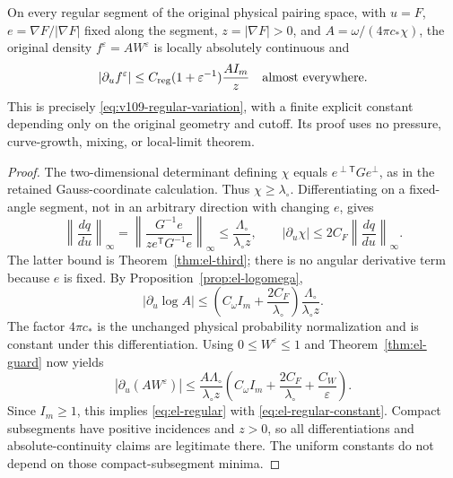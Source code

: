\begin{theorem}
\label{thm:el-regular}
On every regular segment of the original physical pairing space,
with $u=F$, $e=\nabla F/|\nabla F|$ fixed along the segment,
$z=|\nabla F|>0$, and
$A=\omega/(4\pi c_*\chi)$, the original density
$f^\varepsilon=AW^\varepsilon$ is locally absolutely continuous and
\begin{equation}\label{eq:el-regular}
 |\partial_u f^\varepsilon|
 \leq C_{\rm reg}(1+\varepsilon^{-1})\frac{AI_m}{z}
 \quad\hbox{almost everywhere.}
\end{equation}
This is precisely \eqref{eq:v109-regular-variation}, with a finite
explicit constant depending only on the original geometry and cutoff.
Its proof uses no pressure, curve-growth, mixing, or local-limit theorem.
\end{theorem}
\begin{proof}
The two-dimensional determinant defining $\chi$ equals
$e^{\perp\mathsf T}Ge^\perp$, as in the retained Gauss-coordinate
calculation. Thus $\chi\geq\lambda_\circ$. Differentiating on a fixed-angle
segment, not in an arbitrary direction with changing $e$, gives
\[
 \left\|\frac{dq}{du}\right\|_\infty
 =\left\|\frac{G^{-1}e}{z e^{\mathsf T}G^{-1}e}\right\|_\infty
 \leq\frac{\Lambda_\circ}{\lambda_\circ z},\qquad
 |\partial_u\chi|\leq2C_F\left\|\frac{dq}{du}\right\|_\infty.
\]
The latter bound is Theorem~\ref{thm:el-third}; there is no angular
derivative term because $e$ is fixed. By Proposition~\ref{prop:el-logomega},
\[
 |\partial_u\log A|
 \leq\left(C_\omega I_m+\frac{2C_F}{\lambda_\circ}\right)
                              \frac{\Lambda_\circ}{\lambda_\circ z}.
\]
The factor $4\pi c_*$ is the unchanged physical probability
normalization and is constant under this differentiation. Using
$0\leq W^\varepsilon\leq1$ and Theorem~\ref{thm:el-guard} now yields
\[
 |\partial_u(AW^\varepsilon)|\leq
 \frac{A\Lambda_\circ}{\lambda_\circ z}
 \left(C_\omega I_m+\frac{2C_F}{\lambda_\circ}
                         +\frac{C_W}{\varepsilon}\right).
\]
Since $I_m\geq1$, this implies \eqref{eq:el-regular} with
\eqref{eq:el-regular-constant}. Compact subsegments have positive
incidences and $z>0$, so all differentiations and absolute-continuity
claims are legitimate there. The uniform constants do not depend on
those compact-subsegment minima.
\end{proof}

